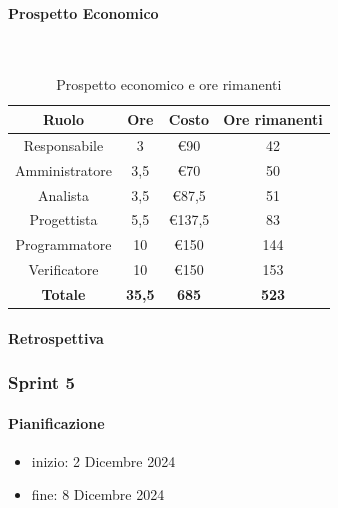 \documentclass{article}
\begin{document}
                \paragraph{Prospetto Economico}\mbox{}\\
                \begin{table}[H]
                    \centering
                    \begin{tabular}{|c|c|c|c|}
                    \hline
                    \textbf{Ruolo}  & \textbf{Ore}  & \textbf{Costo} & \textbf{Ore rimanenti} \\ \hline
                    Responsabile    & 3             & €90            & 42                     \\ \hline
                    Amministratore  & 3,5           & €70            & 50                   \\ \hline
                    Analista        & 3,5           & €87,5          & 51                   \\ \hline
                    Progettista     & 5,5           & €137,5         & 83                   \\ \hline
                    Programmatore   & 10            & €150           & 144                    \\ \hline
                    Verificatore    & 10            & €150           & 153                    \\ \hline
                    \textbf{Totale} & \textbf{35,5} & \textbf{685}   & \textbf{523}         \\ \hline
                    \end{tabular}
                    \caption{Prospetto economico e ore rimanenti}
                \end{table}

                \paragraph{Retrospettiva}
            \subsubsection{Sprint 5}
                \paragraph{Pianificazione}
                \begin{itemize}
                    \item inizio: 2 Dicembre 2024
                    \item fine: 8 Dicembre 2024
                \end{itemize}
\end{document}
